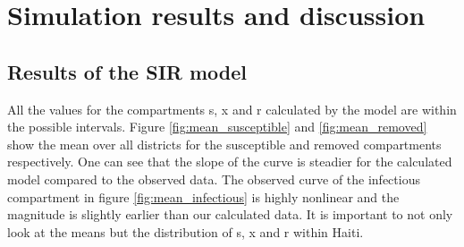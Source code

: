 \documentclass[11pt]{article}
\begin{document}
\section{Simulation results and discussion}
\subsection{Results of the SIR model}
All the values for the compartments s, x and r calculated by the model are within the possible intervals. Figure \ref{fig:mean_susceptible} and \ref{fig:mean_removed} show the mean over all districts for the susceptible and removed compartments respectively. One can see that the slope of the curve is steadier for the calculated model compared to the observed data. The observed curve of the infectious compartment in figure \ref{fig:mean_infectious} is highly nonlinear and the magnitude is slightly earlier than our calculated data. It is important to not only look at the means but the distribution of s, x and r within Haiti.\\
\end{document}
